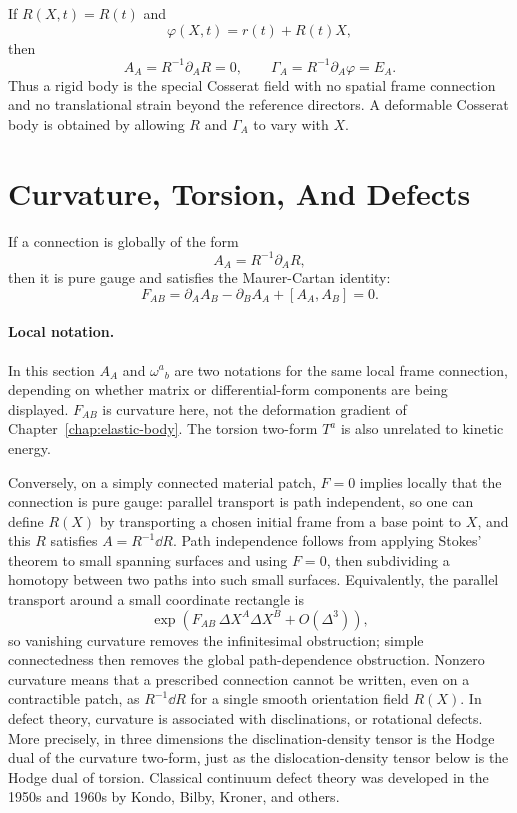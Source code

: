 \begin{remark}
If \(R(X,t)=R(t)\) and
\[
  \varphi(X,t)=r(t)+R(t)X,
\]
then
\[
  A_A=R^{-1}\partial_A R=0,
  \qquad
  \Gamma_A=R^{-1}\partial_A\varphi=E_A.
\]
Thus a rigid body is the special Cosserat field with no spatial frame
connection and no translational strain beyond the reference directors. A
deformable Cosserat body is obtained by allowing \(R\) and \(\Gamma_A\) to vary
with \(X\).
\end{remark}

\section{Curvature, Torsion, And Defects}
\label{sec:curvature-torsion-defects}

If a connection is globally of the form
\[
  A_A=R^{-1}\partial_A R,
\]
then it is pure gauge and satisfies the Maurer-Cartan identity:
\[
  F_{AB}
  =
  \partial_AA_B-\partial_BA_A+[A_A,A_B]
  =
  0.
\]

\paragraph{Local notation.}
In this section \(A_A\) and \(\omega^a{}_b\) are two notations for the same
local frame connection, depending on whether matrix or differential-form
components are being displayed.  \(F_{AB}\) is curvature here, not the
deformation gradient of Chapter~\ref{chap:elastic-body}.  The torsion two-form
\(T^a\) is also unrelated to kinetic energy.

Conversely, on a simply connected material patch, \(F=0\) implies locally that
the connection is pure gauge: parallel transport is path independent, so one
can define \(R(X)\) by transporting a chosen initial frame from a base point to
\(X\), and this \(R\) satisfies \(A=R^{-1}\dd R\). Path independence follows
from applying Stokes' theorem to small spanning surfaces and using \(F=0\), then
subdividing a homotopy between two paths into such small surfaces.
Equivalently, the parallel transport around a small coordinate rectangle is
\[
  \exp\!\left(F_{AB}\,\Delta X^A\Delta X^B+O(\Delta^3)\right),
\]
so vanishing curvature removes the infinitesimal obstruction; simple
connectedness then removes the global path-dependence obstruction.
Nonzero curvature means that a prescribed connection cannot be written, even on
a contractible patch, as \(R^{-1}\dd R\) for a single smooth orientation field
\(R(X)\). In defect theory,
curvature is associated with disclinations, or rotational defects. More
precisely, in three dimensions the disclination-density tensor is the Hodge
dual of the curvature two-form, just as the dislocation-density tensor below is
the Hodge dual of torsion. Classical continuum defect theory was developed in
the 1950s and 1960s by Kondo, Bilby, Kroner, and others.

